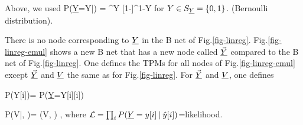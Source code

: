 Above, we used 
\beq
P(\ul{Y}=Y|) = ^{Y}
[1-]^{1-Y}
\eeq
for $Y\in S_{\underline{Y}}=\{0,1\}$. (Bernoulli distribution).

There is no node corresponding to $\underline{Y}$
in the B net of Fig.\ref{fig-linreg}.
Fig.\ref{fig-linreg-emul} shows a new B net
that has a new node called $\vec{\underline{Y}}$
compared to the B net of Fig.\ref{fig-linreg}.
One defines the TPMs
for all nodes of Fig.\ref{fig-linreg-emul}
except $\vec{\underline{Y}}$ and $\underline{V}$ the same
as for Fig.\ref{fig-linreg}. For $\vec{\underline{Y}}$
and $\underline{V}$, one defines

\beq\color{blue}
P(Y[i]\cond {})=
P(\ul{Y}=Y[i]\cond {}[i])
\eeq

\beq\color{blue}
P(V|, \vecy)=
\delta(V, \ln \call)
\;,
\eeq
where ${\cal L} =\prod_i P(\underline{Y}=y[i]{\:\mathbf{|}\:} \hat{y}[i] )$=likelihood.





